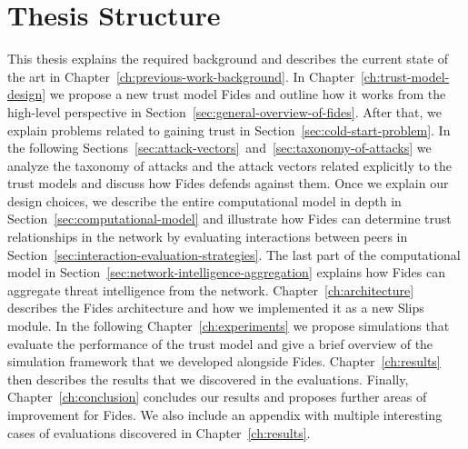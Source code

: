 \section{Thesis Structure}
\label{sec:thesis-structure}
This thesis explains the required background and describes the current state of the art in Chapter~\ref{ch:previous-work-background}.
In Chapter~\ref{ch:trust-model-design} we propose a new trust model Fides and outline how it works from the high-level perspective in Section~\ref{sec:general-overview-of-fides}.
After that, we explain problems related to gaining trust in Section~\ref{sec:cold-start-problem}.
In the following Sections~\ref{sec:attack-vectors}~and~\ref{sec:taxonomy-of-attacks} we analyze the taxonomy of attacks and the attack vectors related explicitly to the trust models and discuss how Fides defends against them.
Once we explain our design choices, we describe the entire computational model in depth in Section~\ref{sec:computational-model} and illustrate how Fides can determine trust relationships in the network by evaluating interactions between peers in Section~\ref{sec:interaction-evaluation-strategies}.
The last part of the computational model in Section~\ref{sec:network-intelligence-aggregation} explains how Fides can aggregate threat intelligence from the network.
Chapter~\ref{ch:architecture} describes the Fides architecture and how we implemented it as a new Slips module.
In the following Chapter~\ref{ch:experiments} we propose simulations that evaluate the performance of the trust model and give a brief overview of the simulation framework that we developed alongside Fides.
Chapter~\ref{ch:results} then describes the results that we discovered in the evaluations. Finally, Chapter~\ref{ch:conclusion} concludes our results and proposes further areas of improvement for Fides. 
We also include an appendix with multiple interesting cases of evaluations discovered in Chapter~\ref{ch:results}.

